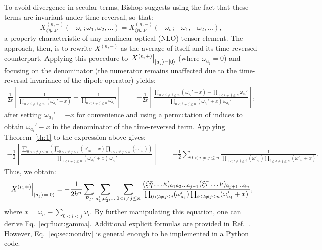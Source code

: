 \documentclass[12pt,a4paper]{article}
\begin{document}
To avoid divergence in secular terms, Bishop \cite{bishopExplicitNondivergentFormulas1994} suggests using the fact that these terms are invariant under time-reversal, so that:
\begin{equation*}
	X^{(n,-)}_{\zeta \eta \ldots \nu}(-\omega_\sigma; \omega_1, \omega_2, \ldots) = X^{(n,-)}_{\zeta \eta \ldots \nu}(+\omega_\sigma; -\omega_1, -\omega_2, \ldots),
\end{equation*}
a property characteristic of any nonlinear optical (NLO) tensor element. The approach, then, is to rewrite $X^{(n,-)}$ as the average of itself and its time-reversed counterpart. Applying this procedure to $\left. X^{(n,+)} \right|_{\ket{a_j} = \ket{0}}$ (where $\omega_{a_j} = 0$) and focusing on the denominator (the numerator remains unaffected due to the time-reversal invariance of the dipole operator) yields:
\begin{align*}
	\frac{1}{2x} \left[ \frac{1}{\prod_{0 < i \neq j \leq n} (\omega_{a_i}' + x)} - \frac{1}{\prod_{0 < i \neq j \leq n} \omega_{a_i}'} \right] 
	&= -\frac{1}{2x} \left[ \frac{\prod_{0 < i \neq j \leq n} (\omega_{a_i}' + x) - \prod_{0 < i \neq j \leq n} \omega_{a_i}'}{\prod_{0 < i \neq j \leq n} (\omega_{a_i}' + x) \, \omega_{a_i}'} \right],
\end{align*}
after setting $\omega_{a_j}' = -x$ for convenience and using a permutation of indices to obtain $\omega_{a_i}' - x$ in the denominator of the time-reversed term. Applying Theorem~\ref{th:1} to the expression above gives:
\begin{align*}
	-\frac{1}{2} \left[ \frac{\sum_{0 < i \neq j \leq n} \left( \prod_{0 < l \neq j < i} (\omega'_{a_l} + x) \prod_{i < l \neq j \leq n} (\omega'_{a_l}) \right)}{\prod_{0 < l \neq j \leq n} (\omega_{a_l}' + x) \, \omega_{a_l}'} \right] 
	&= -\frac{1}{2} \sum_{0 < i \neq j \leq n} \frac{1}{\prod_{0 < l \neq j \leq i} (\omega'_{a_l}) \prod_{i \leq l \neq j \leq n} (\omega'_{a_l} + x)}.
\end{align*}
Thus, we obtain:
\begin{equation}
	\left. X^{(n,+)} \right|_{\ket{a_j} = \ket{0}} = -\frac{1}{2\hbar^n} \sum_{\mathcal{P}_F} \sum_{a_1', a_2', \ldots} \sum_{0 < i \neq j \leq n} \frac{(\zeta \bar{\eta} \ldots \kappa)_{a_1 a_2 \ldots a_{j-1}} (\xi \bar{\tau} \ldots \nu)_{a_{j+1} \ldots a_n}}{\prod_{0 < l \neq j \leq i} (\omega'_{a_l}) \prod_{i \leq l \neq j \leq n} (\omega'_{a_l} + x)}, \label{eq:sec:nondiv}
\end{equation}
where $x = \omega_\sigma - \sum_{0 < l < j} \omega_l$. By further manipulating this equation, one can derive Eq.~\eqref{eq:fluct:gamma}. Additional explicit formulas are provided in Ref.~\cite{bishopExplicitNondivergentFormulas1994}. However, Eq.~\eqref{eq:sec:nondiv} is general enough to be implemented in a Python code.
\end{document}

